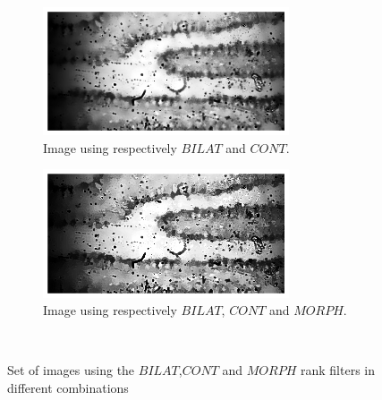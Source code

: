 \begin{figure}[h!]
    \begin{subfigure}[b]{0.5\textwidth}
        \centering
        \includegraphics[width=0.8\textwidth, frame]{afbeeldingen/rank/img_cont_bilat.png}
        \vspace{3mm}
        \caption{Image using respectively $BILAT$ and $CONT$.}
        \label{fig_rank_cont_bilat}
    \end{subfigure}
    \begin{subfigure}[b]{0.5\textwidth}
        \centering
        \includegraphics[width=0.8\textwidth, frame]{afbeeldingen/rank/img_morph_cont_bilat.png}
        \caption[width=1\textwidth]{Image using respectively $BILAT$, $CONT$ and $MORPH$.}
        \label{fig_rank_morph_cont_bilat}
    \end{subfigure}
\\

    \caption{Set of images using the $BILAT$,$CONT$ and $MORPH$ rank filters in different combinations}
	\label{fig_rank}
\end{figure}
\clearpage
